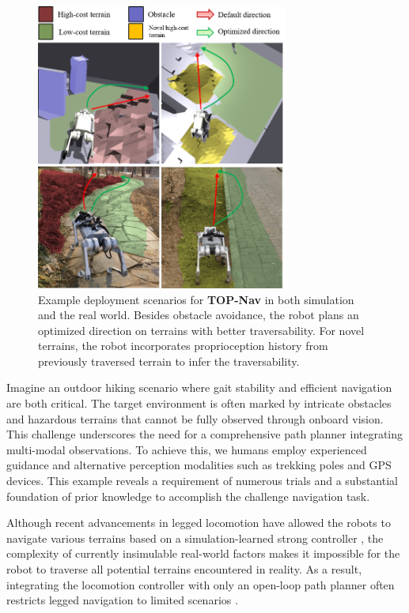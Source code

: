 \documentclass[conference]{IEEEtran}
\begin{document}
\begin{figure}[htbp]
\centerline{\includegraphics[width=8.3cm]{figures/introduction.pdf}}
\caption{Example deployment scenarios for \textbf{TOP-Nav} in both simulation and the real world. Besides obstacle avoidance, the robot plans an optimized direction on terrains with better traversability. For novel terrains, the robot incorporates proprioception history from previously traversed terrain to infer the traversability.}
\label{introcution}
\end{figure}

Imagine an outdoor hiking scenario where gait stability and efficient navigation are both critical. The target environment is often marked by intricate obstacles and hazardous terrains that cannot be fully observed through onboard vision. This challenge underscores the need for a comprehensive path planner integrating multi-modal observations. To achieve this, we humans employ experienced guidance and alternative perception modalities such as trekking poles and GPS devices. This example reveals a requirement of numerous trials and a substantial foundation of prior knowledge to accomplish the challenge navigation task.

Although recent advancements in legged locomotion have allowed the robots to navigate various terrains based on a simulation-learned strong controller \cite{jenelten2024dtc,hwangbo2019learning,cheng2023extreme,zhuang2023robot,zhang2023learning}, the complexity of currently insimulable real-world factors makes it impossible for the robot to traverse all potential terrains encountered in reality. As a result, integrating the locomotion controller with only an open-loop path planner often restricts legged navigation to limited scenarios \cite{hoeller2021learning, caluwaerts2023barkour, kareer2023vinl, truong2021learning}.
\end{document}
